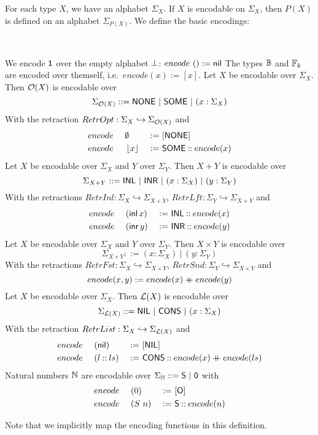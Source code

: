 For each type $X$, we have an alphabet $\Sigma_X$.  If $X$ is encodable on $\Sigma_X$, then $P(X)$ is defined on an alphabet $\Sigma_{P(X)}$.  We
define the basic encodings:
\begin{definition}
  \label{def:basic-encodings}
  ~
  \begin{enumerate}
   We encode $\mathsf{1}$ over the empty alphabet $\bot$: $encode~\mathsf{()} := \mathsf{nil}$
   The types $\mathbb{B}$ and $\mathbb{F}_k$ are encoded over themself, i.e.\ $encode(x):=[x]$.
   Let $X$ be encodable over $\Sigma_X$.  Then $\mathcal{O}(X)$ is encodable over
    \[ \Sigma_{\mathcal{O}(X)} ::= \mathsf{NONE} ~|~ \mathsf{SOME} ~|~ (x:\Sigma_X) \]
    With the retraction $RetrOpt : \Sigma_X \hookrightarrow \Sigma_{\mathcal{O}(X)}$ and
    \begin{alignat*}{3}
      &encode~&&\emptyset  &~:=~& [\mathsf{NONE}] \\
      &encode~&&\left\lfloor {x} \right\rfloor&~:=~& \mathsf{SOME} \mathbin{::} encode(x)
    \end{alignat*}
   Let $X$ be encodable over $\Sigma_X$ and $Y$ over $\Sigma_Y$.  Then $X+Y$ is encodable over
    \[ \Sigma_{X+Y} ::= \mathsf{INL} ~|~ \mathsf{INR} ~|~ (x:\Sigma_X) ~|~ (y:\Sigma_Y) \] With the retractions
    $RetrInl : \Sigma_X \hookrightarrow \Sigma_{X+Y}$, $RetrLft : \Sigma_Y \hookrightarrow \Sigma_{X+Y}$ and
    \begin{alignat*}{3}
      &encode~&&(\operatorname{\mathsf{inl}} x)&~:=~& \mathsf{INL} \mathbin{::} encode(x) \\
      &encode~&&(\operatorname{\mathsf{inr}} y)&~:=~& \mathsf{INR} \mathbin{::} encode(y)
    \end{alignat*}
   Let $X$ be encodable over $\Sigma_X$ and $Y$ over $\Sigma_Y$.  Then $X \times Y$ is encodable over
    \[ \Sigma_{X \times Y} ::= (x:\Sigma_X) ~|~ (y:\Sigma_Y) \] With the retractions
    $RetrFst : \Sigma_X \hookrightarrow \Sigma_{X \times Y}$, $RetrSnd : \Sigma_Y \hookrightarrow \Sigma_{X \times Y}$ and
    \[
      encode(x,y) := encode(x) \mathbin{+\mkern-10mu+} encode(y)
    \]
   Let $X$ be encodable over $\Sigma_X$.  Then $\mathcal{L}(X)$ is encodable over
    \[ \Sigma_{\mathcal{L}(X)} ::= \mathsf{NIL} ~|~ \mathsf{CONS} ~|~ (x:\Sigma_X) \]
    With the retraction $RetrList : \Sigma_X \hookrightarrow \Sigma_{\mathcal{L}(X)}$ and
    \begin{alignat*}{3}
      &encode~&&(\mathsf{nil}      ) &~:=~& [\mathsf{NIL}] \\
      &encode~&&(l \mathbin{::} ls) &~:=~& \mathsf{CONS} \mathbin{::} encode(x) \mathbin{+\mkern-10mu+} encode(ls)
    \end{alignat*}
   Natural numbers $\mathbb{N}$ are encodable over $\Sigma_{\mathbb{N}} ::= \mathsf{S} ~|~ \mathsf{0} $ with
    \begin{alignat*}{3}
      &encode~&&(0  ) &~:=~& [\mathsf{O}] \\
      &encode~&&(S~n) &~:=~& \mathsf{S} \mathbin{::} encode(n)
    \end{alignat*}
  \end{enumerate}
  Note that we implicitly map the encoding functions in this definition.
\end{definition}

